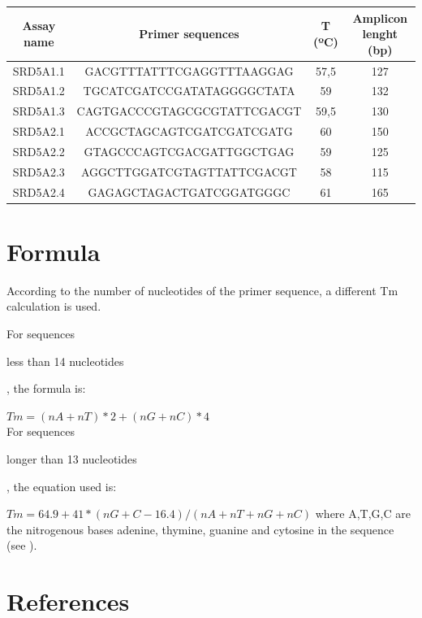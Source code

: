 \documentclass[a4paper,11pt]{article}
\begin{document}
\begin{center} 
	\begin{tabular}{|c|c|c|c|}
	\hline
	Assay name & Primer sequences & T (ºC)  & Amplicon lenght (bp) \\
	\hline SRD5A1.1 & GACGTTTATTTCGAGGTTTAAGGAG & 57,5 & 127 \\
	\hline SRD5A1.2 & TGCATCGATCCGATATAGGGGCTATA & 59 & 132 \\ 
	\hline SRD5A1.3 & CAGTGACCCGTAGCGCGTATTCGACGT & 59,5 & 130 \\
	\hline SRD5A2.1 & ACCGCTAGCAGTCGATCGATCGATG & 60 & 150 \\
	\hline SRD5A2.2 & GTAGCCCAGTCGACGATTGGCTGAG & 59 & 125 \\
	\hline SRD5A2.3 & AGGCTTGGATCGTAGTTATTCGACGT & 58 & 115 \\
	\hline SRD5A2.4 & GAGAGCTAGACTGATCGGATGGGC & 61 & 165 \\
	\hline
	
	\end{tabular}
\end{center}

\section{Formula}
According to the number of nucleotides of the primer sequence, a different Tm calculation is used. 

For sequences \begin{bf} less than 14 nucleotides \end{bf}, the formula is:

$Tm= (n  A+nT) * 2 + (nG+nC) * 4$
\\ For sequences \begin{bf} longer than 13 nucleotides \end{bf}, the equation used is:

$Tm= 64.9 + 41*(nG+C-16.4)/(nA+nT+nG+nC)$
where A,T,G,C are the nitrogenous bases adenine, thymine, guanine and cytosine in the sequence (see \cite{Marmur1962}).


\section{References}

 
\end{document}
